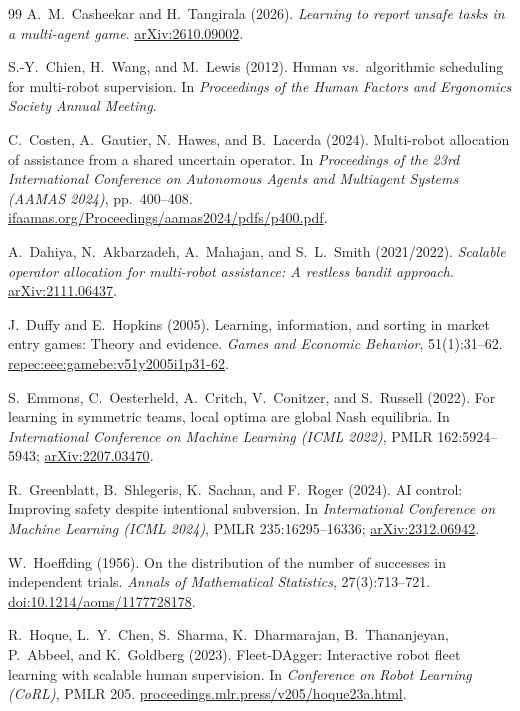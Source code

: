 \documentclass[11pt,reqno]{amsart}
\theoremstyle{spacious}
\begin{document}
\begin{thebibliography}{99}
A.~M.~Casheekar and H.~Tangirala (2026). \emph{Learning to report unsafe tasks in a multi-agent game}. \href{https://arxiv.org/abs/2610.09002}{arXiv:2610.09002}.

S.-Y.~Chien, H.~Wang, and M.~Lewis (2012). Human vs.\ algorithmic scheduling for multi-robot supervision. In \emph{Proceedings of the Human Factors and Ergonomics Society Annual Meeting}.

C.~Costen, A.~Gautier, N.~Hawes, and B.~Lacerda (2024). Multi-robot allocation of assistance from a shared uncertain operator. In \emph{Proceedings of the 23rd International Conference on Autonomous Agents and Multiagent Systems (AAMAS 2024)}, pp.~400--408. \href{https://www.ifaamas.org/Proceedings/aamas2024/pdfs/p400.pdf}{ifaamas.org/Proceedings/aamas2024/pdfs/p400.pdf}.

A.~Dahiya, N.~Akbarzadeh, A.~Mahajan, and S.~L.~Smith (2021/2022). \emph{Scalable operator allocation for multi-robot assistance: A restless bandit approach}. \href{https://arxiv.org/abs/2111.06437}{arXiv:2111.06437}.

J.~Duffy and E.~Hopkins (2005). Learning, information, and sorting in market entry games: Theory and evidence. \emph{Games and Economic Behavior}, 51(1):31--62. \href{https://ideas.repec.org/a/eee/gamebe/v51y2005i1p31-62.html}{repec:eee:gamebe:v51y2005i1p31-62}.

S.~Emmons, C.~Oesterheld, A.~Critch, V.~Conitzer, and S.~Russell (2022). For learning in symmetric teams, local optima are global Nash equilibria. In \emph{International Conference on Machine Learning (ICML 2022)}, PMLR 162:5924--5943; \href{https://arxiv.org/abs/2207.03470}{arXiv:2207.03470}.

R.~Greenblatt, B.~Shlegeris, K.~Sachan, and F.~Roger (2024). AI control: Improving safety despite intentional subversion. In \emph{International Conference on Machine Learning (ICML 2024)}, PMLR 235:16295--16336; \href{https://arxiv.org/abs/2312.06942}{arXiv:2312.06942}.

W.~Hoeffding (1956). On the distribution of the number of successes in independent trials. \emph{Annals of Mathematical Statistics}, 27(3):713--721. \href{https://projecteuclid.org/journals/annals-math-stat/1177728178}{doi:10.1214/aoms/1177728178}.

R.~Hoque, L.~Y.~Chen, S.~Sharma, K.~Dharmarajan, B.~Thananjeyan, P.~Abbeel, and K.~Goldberg (2023). Fleet-DAgger: Interactive robot fleet learning with scalable human supervision. In \emph{Conference on Robot Learning (CoRL)}, PMLR 205. \href{https://proceedings.mlr.press/v205/hoque23a.html}{proceedings.mlr.press/v205/hoque23a.html}.


\end{thebibliography}
\end{document}
